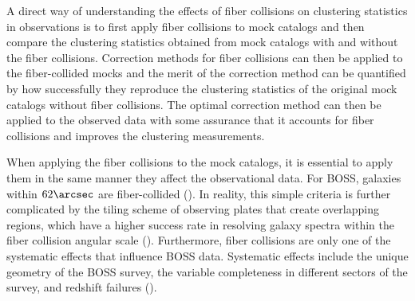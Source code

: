 \documentclass{emulateapj}
\begin{document}
A direct way of understanding the effects of fiber collisions on clustering statistics in observations is to first apply fiber collisions to mock catalogs and then compare the clustering statistics obtained from mock catalogs with and without the fiber collisions. Correction methods for fiber collisions can then be applied to the fiber-collided mocks and the merit of the correction method can be quantified by how successfully they reproduce the clustering statistics of the original mock catalogs without fiber collisions. The optimal correction method can then be applied to the observed data with some assurance that it accounts for fiber collisions and improves the clustering measurements. 

When applying the fiber collisions to the mock catalogs, it is essential to apply them in the same manner they affect the observational data. For BOSS, galaxies within $62\arcsec$ are fiber-collided (\citealt{Anderson:2012aa}). In reality, this simple criteria is further complicated by the tiling scheme of observing plates that create overlapping regions, which have a higher success rate in resolving galaxy spectra within the fiber collision angular scale (\citealt{Guo:2012aa}). Furthermore, fiber collisions are only one of the systematic effects that influence BOSS data. Systematic effects include the unique geometry of the BOSS survey, the variable completeness in different sectors of the survey, and redshift failures (\citealt{Anderson:2012aa}). 

\def \cmasscolor{black}
\def \ldgcolor{blue}
\def \qpmcolor{orange}
\def \tmcolor{green}
\end{document}
